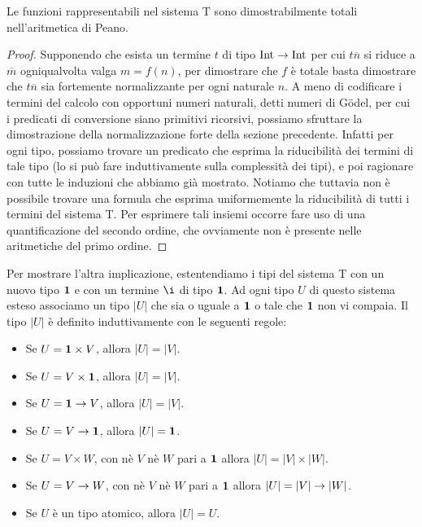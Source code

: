 \documentclass[]{marticle}
\begin{document}
\begin{block}[Proposizione]
    Le funzioni rappresentabili nel sistema T sono dimostrabilmente totali
    nell'aritmetica di Peano.
\end{block}
\begin{proof}
    Supponendo che esista un termine $t$ di tipo $\text{Int}\rightarrow\text{Int}$ per cui
    $t\overline{n}$ si riduce a $\overline{m}$ ogniqualvolta valga $m = f(n)$,
    per dimostrare che $f$ \`e totale basta dimostrare che $t\overline{n}$ sia
    fortemente normalizzante per ogni naturale $n$. A meno di codificare i
    termini del calcolo con opportuni numeri naturali, detti numeri di G\"odel,
    per cui i predicati di conversione siano primitivi ricorsivi, possiamo
    sfruttare la dimostrazione della normalizzazione forte della sezione
    precedente. Infatti per ogni tipo, possiamo trovare un predicato che esprima
    la riducibilit\`a dei termini di tale tipo (lo si pu\`o fare induttivamente
    sulla complessit\`a dei tipi), e poi ragionare con tutte le induzioni che
    abbiamo gi\`a mostrato. Notiamo che tuttavia non \`e possibile trovare una
    formula che esprima uniformemente la riducibilit\`a di tutti i termini del
    sistema T. Per esprimere tali insiemi occorre fare uso di una
    quantificazione del secondo ordine, che ovviamente non \`e presente nelle
    aritmetiche del primo ordine.
\end{proof}

Per mostrare l'altra implicazione, estentendiamo i tipi del sistema T con un
nuovo tipo $\text{\textbf{1}}$ e con un termine $\i$ di tipo $\text{\textbf{1}}$. Ad ogni tipo $U$ di
questo sistema esteso associamo un tipo $|U|$ che sia o uguale a $\text{\textbf{1}}$ o tale
che $\text{\textbf{1}}$ non vi compaia. Il tipo $|U|$ \`e definito induttivamente con le
seguenti regole:
\begin{itemize}
    \item Se $U= \text{\textbf{1}} \times V$, allora $|U|=|V|$.
    \item Se $U= V \times \text{\textbf{1}}$, allora $|U|=|V|$.
    \item Se $U= \text{\textbf{1}} \rightarrow V$, allora $|U|=|V|$.
    \item Se $U= V \rightarrow \text{\textbf{1}}$, allora $|U|=\text{\textbf{1}}$.
    \item Se $U=V\times W$, con n\`e $V$ n\`e $W$ pari a $\text{\textbf{1}}$ allora $|U|=|V|
        \times |W|$.
    \item Se $U=V\rightarrow W$, con n\`e $V$ n\`e $W$ pari a $\text{\textbf{1}}$ allora $|U|=|V|
        \rightarrow |W|$.
    \item Se $U$ \`e un tipo atomico, allora $|U|=U$.
\end{itemize}
\end{document}
